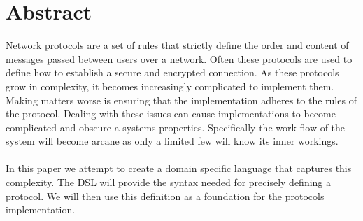 \section*{Abstract}
Network protocols are a set of rules that strictly define the order and content of messages passed between users over a network. Often these protocols are used to define how to establish a secure and encrypted connection. As these protocols grow in complexity, it becomes increasingly complicated to implement them. Making matters worse is ensuring that the implementation adheres to the rules of the protocol. Dealing with these issues can cause implementations to become complicated and obscure a systems properties. Specifically the work flow of the system will become arcane as only a limited few will know its inner workings.
\\\\
In this paper we attempt to create a domain specific language that captures this complexity. The DSL will provide the syntax needed for precisely defining a protocol. We will then use this definition as a foundation for the protocols implementation.
